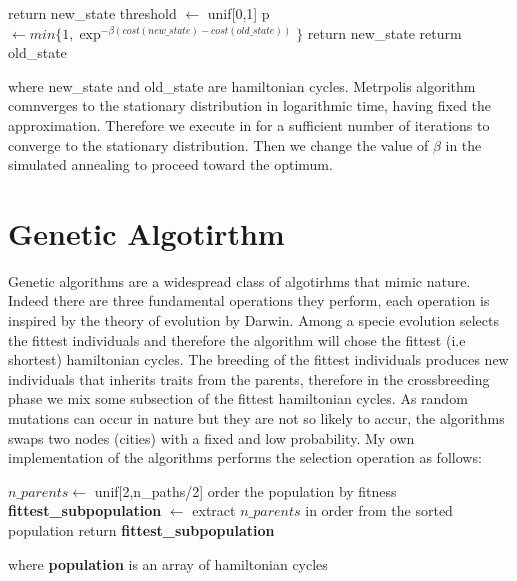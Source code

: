 \documentclass{article}
\begin{document}
\begin{algorithm}[H]
    \begin{algorithmic}[1]
      	\State return new\_state
      	\EndIf
        \State threshold $\leftarrow$ unif[0,1]
        \State p  $\leftarrow min\{1,\exp^{- \beta (cost(new\_state) - cost(old\_state))} \}$ 
        	\State return new\_state
        \Else
        	\State returm old\_state
        \EndIf
       \EndFunction
\end{algorithmic}
\end{algorithm}
where new\_state and old\_state are hamiltonian cycles.
Metrpolis algorithm comnverges to the stationary distribution in logarithmic time, having fixed the approximation. Therefore we execute in for a sufficient number of iterations to converge to the stationary distribution. Then we change the value of $\beta$ in the simulated annealing to proceed toward the optimum.


\section{Genetic Algotirthm}
Genetic algorithms are a widespread class of algotirhms that mimic nature. Indeed there are three fundamental operations they perform, each operation is inspired by the theory of evolution by Darwin. Among a specie evolution selects the fittest individuals and therefore the algorithm will chose the fittest (i.e shortest) hamiltonian cycles. The breeding of the fittest individuals produces new individuals that inherits traits from the parents, therefore in the crossbreeding phase we mix some subsection of the fittest hamiltonian cycles.
As random mutations can occur in nature but they are not so likely to accur, the algorithms swaps two nodes (cities) with a fixed and low probability.
My own implementation of the algorithms performs the selection operation as follows:
\begin{algorithm}[H]
    \begin{algorithmic}[1]
        \State $n\_parents \leftarrow$ unif[2,n\_paths/2]
        \State order the population by fitness
        \State \textbf{fittest\_subpopulation} $\leftarrow$ extract $n\_parents$ in order from the sorted population
        \State return \textbf{fittest\_subpopulation}
       \EndFunction
\end{algorithmic}
\end{algorithm}
\noindent where \textbf{population} is an array of hamiltonian cycles
\end{document}
